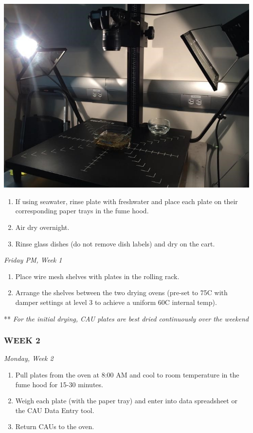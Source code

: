 \documentclass[]{book}
\providecommand{\tightlist}{%
  \setlength{\itemsep}{0pt}\setlength{\parskip}{0pt}}
\begin{document}
\includegraphics{images/DailyTasks7.jpg}

\begin{enumerate}
\def\labelenumi{\arabic{enumi}.}
\setcounter{enumi}{2}
\tightlist
\item
  If using seawater, rinse plate with freshwater and place each plate on their corresponding paper trays in the fume hood.
\item
  Air dry overnight.
\item
  Rinse glass dishes (do not remove dish labels) and dry on the cart.
\end{enumerate}

\emph{Friday PM, Week 1}

\begin{enumerate}
\def\labelenumi{\arabic{enumi}.}
\tightlist
\item
  Place wire mesh shelves with plates in the rolling rack.
\item
  Arrange the shelves between the two drying ovens (pre-set to 75C with damper settings at level 3 to achieve a uniform 60C internal temp).
\end{enumerate}

** \emph{For the initial drying, CAU plates are best dried continuously over the weekend}

\hypertarget{week-2}{%
\subsubsection{WEEK 2}\label{week-2}}

\emph{Monday, Week 2}

\begin{enumerate}
\def\labelenumi{\arabic{enumi}.}
\tightlist
\item
  Pull plates from the oven at 8:00 AM and cool to room temperature in the fume hood for 15-30 minutes.
\item
  Weigh each plate (with the paper tray) and enter into data spreadsheet or the CAU Data Entry tool.
\item
  Return CAUs to the oven.
\end{enumerate}
\end{document}
